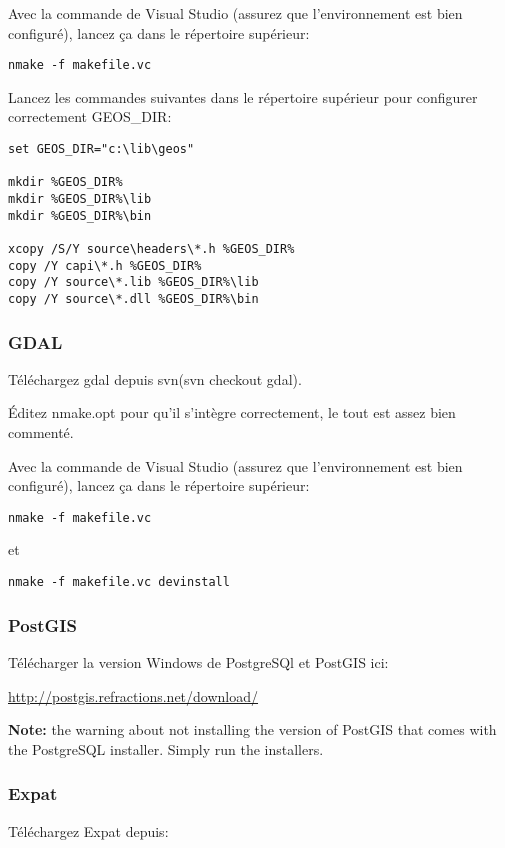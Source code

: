 Avec la commande de Visual Studio (assurez que l'environnement est bien configuré), lancez ça dans le répertoire supérieur:

\begin{verbatim}
nmake -f makefile.vc 
\end{verbatim}

Lancez les commandes suivantes dans le répertoire supérieur pour configurer correctement GEOS\_DIR:

\begin{verbatim}
set GEOS_DIR="c:\lib\geos"

mkdir %GEOS_DIR%
mkdir %GEOS_DIR%\lib
mkdir %GEOS_DIR%\bin

xcopy /S/Y source\headers\*.h %GEOS_DIR%
copy /Y capi\*.h %GEOS_DIR%
copy /Y source\*.lib %GEOS_DIR%\lib
copy /Y source\*.dll %GEOS_DIR%\bin
\end{verbatim}

\subsubsection{GDAL}
Téléchargez gdal depuis svn(svn checkout  gdal).

Éditez nmake.opt pour qu'il s'intègre correctement, le tout est assez bien commenté.

Avec la commande de Visual Studio (assurez que l'environnement est bien configuré), lancez ça dans le répertoire supérieur:

\begin{verbatim}
nmake -f makefile.vc 
\end{verbatim}

et

\begin{verbatim}
nmake -f makefile.vc devinstall 
\end{verbatim}

\subsubsection{PostGIS}
Télécharger la version Windows de PostgreSQl et PostGIS ici:

\url{http://postgis.refractions.net/download/}

\textbf{Note:} the warning about not installing the version of PostGIS that
comes with the PostgreSQL installer. Simply run the installers.

\subsubsection{Expat}
Téléchargez Expat depuis:

